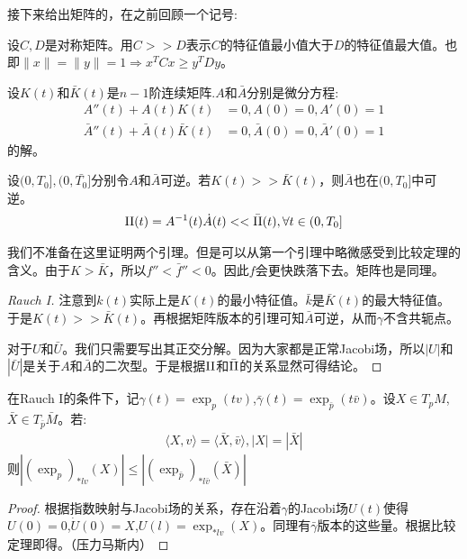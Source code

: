 接下来给出矩阵的，在之前回顾一个记号:

设$C,D$是对称矩阵。用$C>>D$表示$C$的特征值最小值大于$D$的特征值最大值。也即$\|x\|=\|y\|=1 \Rightarrow x^T C x \geq y^T D y$。
\begin{lemma}[矩阵]
    设$K(t)$和$\bar{K}(t)$是$n-1$阶连续矩阵.$A$和$\bar{A}$分别是微分方程:
    \begin{align*}
        A''(t)+A(t)K(t)&=0,A(0)=0,A'(0)=1\\
        \bar{A}''(t)+\bar{A}(t)\bar{K}(t)&=0,\bar{A}(0)=0,\bar{A}'(0)=1
    \end{align*}的解。

    设$(0,T_0],(0,\bar{T_0}]$分别令$A$和$\bar{A}$可逆。若$K(t)>> \bar{K}(t)$，则$\bar{A}$也在$(0,T_0]$中可逆。
    \begin{align*}
        \mathrm{II}(t)=A^{-1}(t)\dot{A}(t)<<\bar{\mathrm{II}}(t),\forall t \in (0,T_0]
    \end{align*}
\end{lemma}
我们不准备在这里证明两个引理。但是可以从第一个引理中略微感受到比较定理的含义。由于$K>\bar{K}$，所以$f''<\bar{f}''<0$。因此$f$会更快跌落下去。矩阵也是同理。
\begin{proof}[Rauch I]
    注意到$k(t)$实际上是$K(t)$的最小特征值。$\bar{k}$是$\bar{K}(t)$的最大特征值。于是$K(t)>>\bar{K}(t)$。再根据矩阵版本的引理可知$\bar{A}$可逆，从而$\gamma$不含共轭点。

    对于$U$和$\bar{U}$。我们只需要写出其正交分解。因为大家都是正常Jacobi场，所以$|U|$和$|\bar{U}|$是关于$A$和$\bar{A}$的二次型。于是根据$\mathrm{II}$和$\bar{\mathrm{II}}$的关系显然可得结论。
\end{proof}

\begin{theorem}[Rauch I']
    在Rauch I的条件下，记$\gamma(t)=\exp_p(tv)$,$\bar{\gamma}(t)=\exp_{\bar{p}}(t\bar{v})$。设$X \in T_pM$,$\bar{X}\in T_{\bar{p}}\bar{M}$。若:
    \begin{align*}
        \langle X,v\rangle=\langle \bar{X},\bar{v}\rangle,|X|=|\bar{X}|
    \end{align*}
    则$|(\exp_p)_{*lv}(X)|\leq |(\exp_{\bar{p}})_{*l\bar{v}}(\bar{X})|$
\end{theorem}
\begin{proof}
    根据指数映射与Jacobi场的关系，存在沿着$\gamma$的Jacobi场$U(t)$使得$U(0)=0$,$\dot{U}(0)=X$,$U(l)=\exp_{*lv}(X)$。同理有$\bar{\gamma}$版本的这些量。根据比较定理即得。（压力马斯内）
\end{proof}

